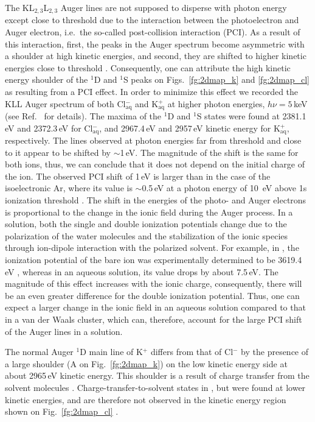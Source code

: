 The KL$_{2,3}$L$_{2,3}$ Auger lines are not supposed to disperse with photon energy except close to threshold due to the interaction between the photoelectron and Auger electron, i.e.\ the so-called post-collision interaction (PCI). As a result of this interaction, first, the peaks in the Auger spectrum become asymmetric with a shoulder at high kinetic energies, and second, they are shifted to higher kinetic energies close to threshold \citep{russek86:911,guillemin15:012503}. Consequently, one can attribute the high kinetic energy shoulder of the $^1$D and $^1$S peaks on Figs.\ \ref{fg:2dmap_k} and \ref{fg:2dmap_cl} as resulting from a PCI effect. In order to minimize this effect we recorded the KLL Auger spectrum of both Cl$^{-}_{\text{aq}}$ and K$^{+}_{\text{aq}}$ at higher photon energies, $h\nu = 5$\,keV (see Ref.\ \citep{ceolin17} for details). The maxima of the $^1$D and $^1$S states were found at 2381.1\,eV and 2372.3\,eV for Cl$^{-}_{\text{aq}}$, and 2967.4\,eV and 2957\,eV kinetic energy for K$^{+}_{\text{aq}}$, respectively. The lines observed at photon energies far from threshold and close to it appear to be shifted by $\sim$1\,eV. The magnitude of the shift is the same for both ions, thus, we can conclude that it does not depend on the initial charge of the ion. The observed PCI shift of 1\,eV is larger than in the case of the isoelectronic Ar, where its value is $\sim$0.5\,eV at a photon energy of 10 \,eV above 1s ionization threshold \citep{guillemin15:012503}. The shift in the energies of the photo- and Auger electrons is proportional to the change in the ionic field during the Auger process. In a solution, both the single and double ionization potentials change due to the polarization of the water molecules and the stabilization of the ionic species through ion-dipole interaction with the polarized solvent. For example, in \ki, the ionization potential of the bare ion was experimentally determined to be 3619.4\,eV \citep{hertlein06:062715}, whereas in an aqueous solution, its value drops by about 7.5\,eV. The magnitude of this effect increases with the ionic charge, consequently, there will be an even greater difference for the double ionization potential. Thus, one can expect a larger change in the ionic field in an aqueous solution compared to that in a van der Waals cluster, which can, therefore, account for the large PCI shift of the Auger lines in a solution.


The normal Auger $^1$D main line of K$^{+}$ differs from that of Cl$^{-}$ by the presence of a large shoulder (A on Fig.\ \ref{fg:2dmap_k}) on the low kinetic energy side at about 2965\,eV kinetic energy. This shoulder is a result of charge transfer from the solvent molecules \citep{ceolin17}. Charge-transfer-to-solvent states  in \cli, but were found at lower kinetic energies, and are therefore not observed in the kinetic energy region shown on Fig.\ \ref{fg:2dmap_cl} \citep{ceolin17}.


